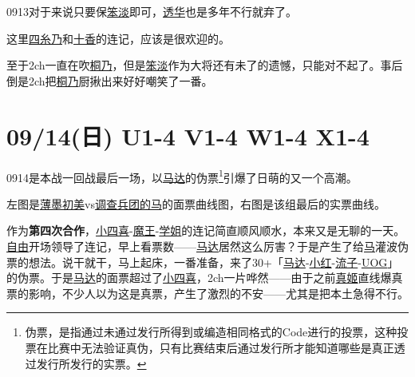 0913对于来说只要保\uline{笨淡}即可，\uline{透华}也是多年不行就弃了。

这里\uline{四糸乃}和\uline{十香}的连记，应该是很欢迎的。

至于2ch一直在吹\uline{桐乃}，但是\uline{笨淡}作为大将还有未了的遗憾，只能对不起了。事后倒是2ch把\uline{桐乃}厨揪出来好好嘲笑了一番。

\section{09/14(日) U1-4 V1-4 W1-4 X1-4}

0914是本战一回战最后一场，以\uline{马达}的伪票\footnote{伪票，是指通过未通过发行所得到或编造相同格式的Code进行的投票，这种投票在比赛中无法验证真伪，只有比赛结束后通过发行所才能知道哪些是真正透过发行所发行的实票。}引爆了日萌的又一个高潮。


左图是\uline{薄墨初美}vs\uline{调查兵团的马}的面票曲线图，右图是该组最后的实票曲线。

作为\textbf{第四次合作}，\uline{小四喜}-\uline{魔王}-\uline{学姐}的连记简直顺风顺水，本来又是无聊的一天。\uline{自由}开场领导了连记，早上看票数——\uline{马达}居然这么厉害？于是产生了给\uline{马}灌波伪票的想法。说干就干，马上起床，一番准备，来了30+「\uline{马达}-\uline{小红}-\uline{流子}-\uline{UOG}」的伪票。于是\uline{马达}的面票超过了\uline{小四喜}，2ch一片哗然——由于之前\uline{真姬}直线爆真票的影响，不少人以为这是真票，产生了激烈的不安——尤其是把本土急得不行。

